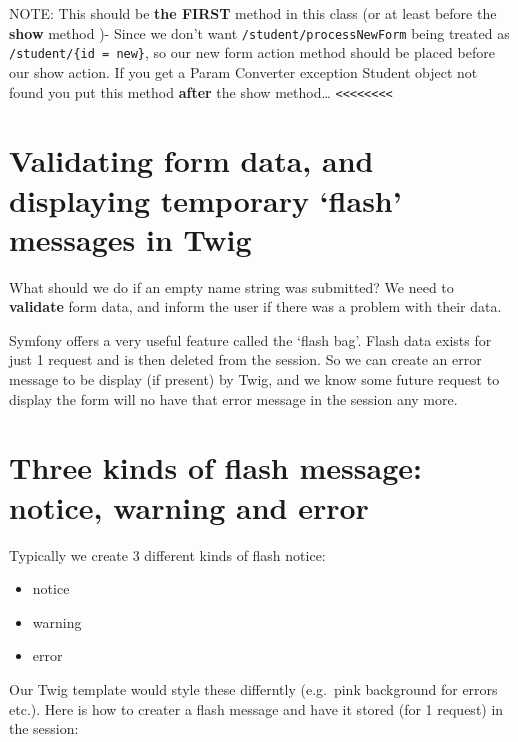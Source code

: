 \documentclass[a4paperpaper,openright]{book}
\providecommand{\tightlist}{%
  \setlength{\itemsep}{0pt}\setlength{\parskip}{0pt}}
\begin{document}
NOTE: This should be \textbf{the FIRST} method in this class (or at
least before the \textbf{show} method )- Since we don't want
\texttt{/student/processNewForm} being treated as
\texttt{/student/\{id\ =\ \textquotesingle{}new\textquotesingle{}\}}, so
our new form action method should be placed before our show action. If
you get a Param Converter exception Student object not found you put
this method \textbf{after} the show method\ldots{}
\texttt{\textless{}\textless{}\textless{}\textless{}\textless{}\textless{}\textless{}\textless{}}

\hypertarget{validating-form-data-and-displaying-temporary-flash-messages-in-twig}{%
\section{Validating form data, and displaying temporary `flash' messages
in
Twig}\label{validating-form-data-and-displaying-temporary-flash-messages-in-twig}}

What should we do if an empty name string was submitted? We need to
\textbf{validate} form data, and inform the user if there was a problem
with their data.

Symfony offers a very useful feature called the `flash bag'. Flash data
exists for just 1 request and is then deleted from the session. So we
can create an error message to be display (if present) by Twig, and we
know some future request to display the form will no have that error
message in the session any more.

\hypertarget{three-kinds-of-flash-message-notice-warning-and-error}{%
\section{Three kinds of flash message: notice, warning and
error}\label{three-kinds-of-flash-message-notice-warning-and-error}}

Typically we create 3 different kinds of flash notice:

\begin{itemize}
\tightlist
\item
  notice
\item
  warning
\item
  error
\end{itemize}

Our Twig template would style these differntly (e.g.~pink background for
errors etc.). Here is how to creater a flash message and have it stored
(for 1 request) in the session:
\end{document}
